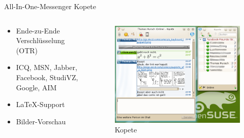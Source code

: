 \begin{frame}{All-In-One-Messenger Kopete}
  \begin{columns}
    \begin{column}{0.45\textwidth}
      \begin{itemize}
        \item Ende-zu-Ende Verschlüsselung (OTR)
        \item ICQ, MSN, Jabber, Facebook, StudiVZ, Google, AIM
        \item \LaTeX-Support
        \item Bilder-Vorschau
      \end{itemize}      
    \end{column}
    \begin{column}{0.55\textwidth}
      \begin{figure}
        \includegraphics[bb=0 0 493 382,keepaspectratio=true,width=\textwidth]{kopete}
        \caption{Kopete}
      \end{figure}
    \end{column}
  \end{columns}
\end{frame}

